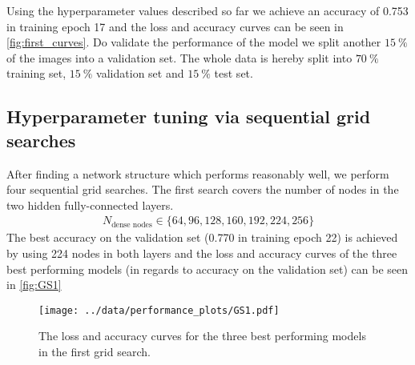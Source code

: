 Using the hyperparameter values described so far we achieve an accuracy of 0.753 in training epoch 17 and the loss and accuracy curves can be seen in \autoref{fig:first_curves}. 
Do validate the performance of the model we split another $\SI{15}{\percent}$ of the images into a validation set.
The whole data is hereby split into $\SI{70}{\percent}$ training set, $\SI{15}{\percent}$ validation set and $\SI{15}{\percent}$ test set.


\subsection{Hyperparameter tuning via sequential grid searches}
After finding a network structure which performs reasonably well, we perform four sequential grid searches.
The first search covers the number of nodes in the two hidden fully-connected layers.
\begin{align}
    N_\text{dense nodes} \in \{64, 96, 128, 160, 192, 224, 256\}
\end{align}
The best accuracy on the validation set (0.770 in training epoch 22) is achieved by using 224 nodes in both layers and the loss and accuracy curves of the three best performing models 
(in regards to accuracy on the validation set) can be seen in \autoref{fig:GS1}
\begin{figure}
    \centering
    \texttt{[image: ../data/performance\_plots/GS1.pdf]}
    \caption{The loss and accuracy curves for the three best performing models in the first grid search.}
    \label{fig:GS1}
\end{figure}


